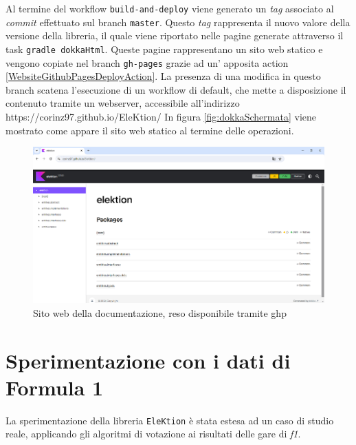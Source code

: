 \documentclass[12pt,a4paper,openright,twoside]{book}
\begin{document}
Al termine del workflow \texttt{build-and-deploy} viene generato un \textit{tag}
associato al \textit{commit} effettuato sul branch \texttt{master}. Questo \textit{tag}
rappresenta il nuovo valore della versione della libreria, il quale viene riportato nelle pagine
generate attraverso il task \texttt{gradle dokkaHtml}.
Queste pagine rappresentano un sito web statico e vengono copiate nel branch \texttt{gh-pages} grazie ad un'
apposita action \ref{WebsiteGithubPagesDeployAction}. 
La presenza di una modifica in questo branch scatena l'esecuzione di un workflow di default,
che mette a disposizione il contenuto tramite un webserver, accessibile all'indirizzo https://corinz97.github.io/EleKtion/
In figura \ref{fig:dokkaSchermata} viene mostrato come appare il sito web statico al termine delle operazioni.

\begin{figure}[H]
    \centering
     \includegraphics[scale=0.8]{figures/schermatadocumentazione.png}
     \caption{Sito web della documentazione, reso disponibile tramite \ac{ghp} }
     \label{fig:classifichegeneralireali2023figura}
 \end{figure}


\chapter{Sperimentazione con i dati di Formula 1}
La sperimentazione della libreria \texttt{EleKtion} è stata estesa ad un
caso di studio reale, applicando gli algoritmi di votazione ai risultati 
delle gare di \textit{\ac{f1}}.
\end{document}

